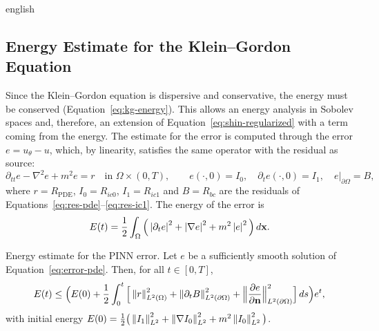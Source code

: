 \documentclass[0000.tex]{subfiles}
\begin{document}
\begin{hyphenrules}{english}
\subsection{Energy Estimate for the Klein--Gordon Equation}\label{subsec:energy-estimate}\label{sec:energy-estimate}

Since the Klein--Gordon equation is dispersive and conservative, the energy must be conserved
(Equation~\eqref{eq:kg-energy}). This allows an energy analysis in Sobolev spaces and, therefore, an extension
of Equation~\eqref{eq:shin-regularized} with a term coming from the energy. The estimate for the error is computed
through the error $e=u_\theta-u$, which, by linearity, satisfies the same operator with the residual as
source:
\begin{equation}
  \partial_{tt}e-\nabla^2e+m^2e=r\quad\text{in }\Omega\times(0,T),\qquad
  e(\cdot,0)=I_0,\quad\partial_te(\cdot,0)=I_1,\quad e|_{\partial\Omega}=B,
  \label{eq:error-pde}
\end{equation}
where $r=R_{\mathrm{PDE}}$, $I_0=R_{ic0}$, $I_1=R_{ic1}$ and $B=R_{bc}$ are the residuals of
Equations~\eqref{eq:res-pde}--\eqref{eq:res-ic1}. The energy of the error is
\begin{equation}
  E(t)=\frac12\int_\Omega\Big(\left\lvert \partial_te \right\rvert^2+\left\lvert \nabla e \right\rvert^2+m^2\left\lvert e \right\rvert^2\Big)\,d\mathbf{x}.
  \label{eq:error-energy}
\end{equation}

\begin{teorema}{Energy estimate for the PINN error.}\label{thm:energy-estimate}
Let $e$ be a sufficiently smooth solution of Equation~\eqref{eq:error-pde}. Then, for all $t\in[0,T]$,
\begin{equation}
  E(t)\le\Big(E(0)+\frac12\int_0^t\Big[\left\lVert r \right\rVert^2_{L^2(\Omega)}+\left\lVert \partial_tB \right\rVert^2_{L^2(\partial\Omega)}
  +\Big\|\frac{\partial e}{\partial\mathbf{n}}\Big\|^2_{L^2(\partial\Omega)}\Big]\,d s\Big)e^{t},
  \label{eq:energy-bound}
\end{equation}
with initial energy
$E(0)=\frac12\big(\left\lVert I_1 \right\rVert^2_{L^2}+\left\lVert \nabla I_0 \right\rVert^2_{L^2}+m^2\left\lVert I_0 \right\rVert^2_{L^2}\big)$.
\end{teorema}


\end{hyphenrules}
\end{document}
